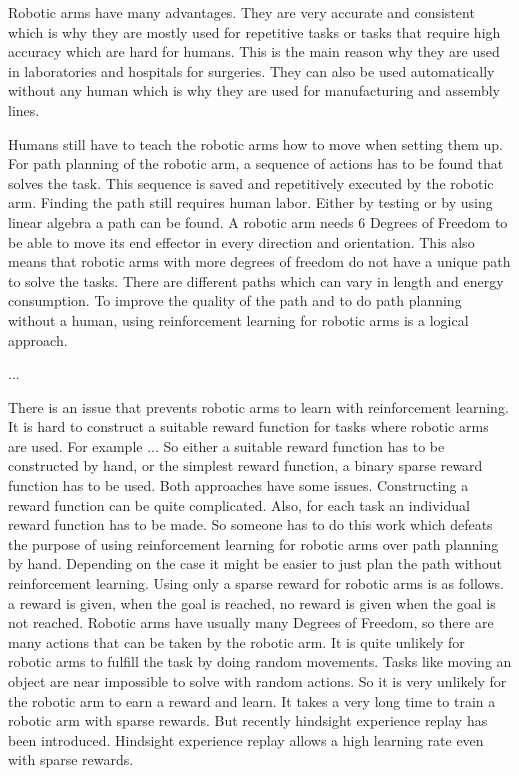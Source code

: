 Robotic arms have many advantages. They are very accurate and consistent which is why they are mostly used for repetitive tasks or tasks that require high accuracy which are hard for humans. 
This is the main reason why they are used in laboratories and hospitals for surgeries. They can also be used automatically without any human which is why they are used for manufacturing and assembly lines. 

Humans still have to teach the robotic arms how to move when setting them up. For path planning of the robotic arm, a sequence of actions has to be found that solves the task. This sequence is saved and repetitively executed by the robotic arm. Finding the path still requires human labor. Either by testing or by using linear algebra a path can be found. 
A robotic arm needs 6 Degrees of Freedom to be able to move its end effector in every direction and orientation. This also means that robotic arms with more degrees of freedom do not have a unique path to solve the tasks. There are different paths which can vary in length and energy consumption.
To improve the quality of the path and to do path planning without a human, using reinforcement learning for robotic arms is a logical approach. 

\vspace{0.5cm}


...




There is an issue that prevents robotic arms to learn with reinforcement learning. It is hard to construct a suitable reward function for tasks where robotic arms are used. For example ... 
So either a suitable reward function has to be constructed by hand, or the simplest reward function, a binary sparse reward function has to be used. 
Both approaches have some issues. 
Constructing a reward function can be quite complicated. Also, for each task an individual reward function has to be made. So someone has to do this work which defeats the purpose of using reinforcement learning for robotic arms over path planning by hand. Depending on the case it might be easier to just plan the path without reinforcement learning.
Using only a sparse reward for robotic arms is as follows. a reward is given, when the goal is reached, no reward is given when the goal is not reached. Robotic arms have usually many Degrees of Freedom, so there are many actions that can be taken by the robotic arm. It is quite unlikely for robotic arms to fulfill the task by doing random movements. Tasks like moving an object are near impossible to solve with random actions. 
So it is very unlikely for the robotic arm to earn a reward and learn. It takes a very long time to train a robotic arm with sparse rewards.
But recently hindsight experience replay has been introduced. 
Hindsight experience replay allows a high learning rate even with sparse rewards. 


